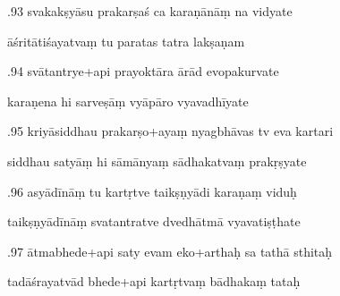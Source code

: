 \documentclass[article,12pt,a4paper]{memoir}%
\newcounter{parCount}
\begin{document}
	  
	  \pstart {}.93 svakakṣyāsu prakarṣaś ca karaṇānāṃ na vidyate 
	{}
	\pend%
      

	  
	  \pstart \leavevmode%
	āśritātiśayatvaṃ tu paratas tatra lakṣaṇam 
	{}
	\pend%
      

	  
	  \pstart {}.94 svātantrye+api prayoktāra ārād evopakurvate 
	{}
	\pend%
      

	  
	  \pstart \leavevmode%
	karaṇena hi sarveṣāṃ vyāpāro vyavadhīyate 
	{}
	\pend%
      

	  
	  \pstart {}.95 kriyāsiddhau prakarṣo+ayaṃ nyagbhāvas tv eva kartari 
	{}
	\pend%
      

	  
	  \pstart \leavevmode%
	siddhau satyāṃ hi sāmānyaṃ sādhakatvaṃ prakṛṣyate 
	{}
	\pend%
      

	  
	  \pstart {}.96 asyādīnāṃ tu kartṛtve taikṣṇyādi karaṇaṃ viduḥ 
	{}
	\pend%
      

	  
	  \pstart \leavevmode%
	taikṣṇyādīnāṃ svatantratve dvedhātmā vyavatiṣṭhate 
	{}
	\pend%
      

	  
	  \pstart {}.97 ātmabhede+api saty evam eko+arthaḥ sa tathā sthitaḥ 
	{}
	\pend%
      

	  
	  \pstart \leavevmode%
	tadāśrayatvād bhede+api kartṛtvaṃ bādhakaṃ tataḥ 
	{}
	\pend%
      
\end{document}
